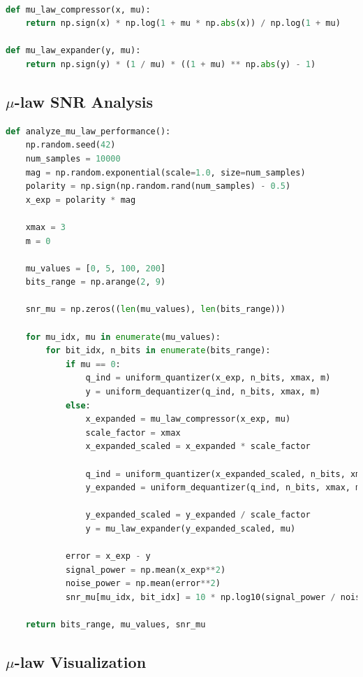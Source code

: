 \documentclass{article}
\begin{document}
\begin{lstlisting}[language=Python, caption=$\mu$-law  Functions]

def mu_law_compressor(x, mu):
    return np.sign(x) * np.log(1 + mu * np.abs(x)) / np.log(1 + mu)

def mu_law_expander(y, mu):
    return np.sign(y) * (1 / mu) * ((1 + mu) ** np.abs(y) - 1)
\end{lstlisting}

\subsection{$\mu$-law  SNR Analysis}

\begin{lstlisting}[language=Python, caption=$\mu$-law  SNR Analysis ]
def analyze_mu_law_performance():
    np.random.seed(42)
    num_samples = 10000
    mag = np.random.exponential(scale=1.0, size=num_samples)
    polarity = np.sign(np.random.rand(num_samples) - 0.5)
    x_exp = polarity * mag

    xmax = 3
    m = 0

    mu_values = [0, 5, 100, 200]
    bits_range = np.arange(2, 9)

    snr_mu = np.zeros((len(mu_values), len(bits_range)))

    for mu_idx, mu in enumerate(mu_values):
        for bit_idx, n_bits in enumerate(bits_range):
            if mu == 0:
                q_ind = uniform_quantizer(x_exp, n_bits, xmax, m)
                y = uniform_dequantizer(q_ind, n_bits, xmax, m)
            else:
                x_expanded = mu_law_compressor(x_exp, mu)
                scale_factor = xmax
                x_expanded_scaled = x_expanded * scale_factor

                q_ind = uniform_quantizer(x_expanded_scaled, n_bits, xmax, m)
                y_expanded = uniform_dequantizer(q_ind, n_bits, xmax, m)

                y_expanded_scaled = y_expanded / scale_factor
                y = mu_law_expander(y_expanded_scaled, mu)

            error = x_exp - y
            signal_power = np.mean(x_exp**2)
            noise_power = np.mean(error**2)
            snr_mu[mu_idx, bit_idx] = 10 * np.log10(signal_power / noise_power)
            
    return bits_range, mu_values, snr_mu
\end{lstlisting}

\subsection{$\mu$-law  Visualization}
\end{document}
